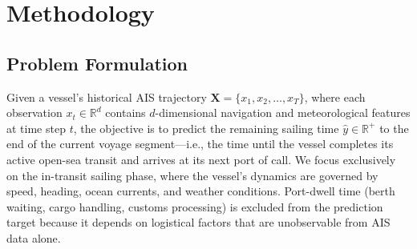 \documentclass[sigconf,anonymous]{acmart}%
\begin{document}
\section{Methodology}

\subsection{Problem Formulation}

Given a vessel's historical AIS trajectory $\mathbf{X} = \{x_1, x_2, \ldots, x_T\}$, where each observation $x_t \in \mathbb{R}^{d}$ contains $d$-dimensional navigation and meteorological features at time step $t$, the objective is to predict the remaining sailing time $\hat{y} \in \mathbb{R}^{+}$ to the end of the current voyage segment---i.e., the time until the vessel completes its active open-sea transit and arrives at its next port of call.
We focus exclusively on the in-transit sailing phase, where the vessel's dynamics are governed by speed, heading, ocean currents, and weather conditions. Port-dwell time (berth waiting, cargo handling, customs processing) is excluded from the prediction target because it depends on logistical factors that are unobservable from AIS data alone.




\end{document}
